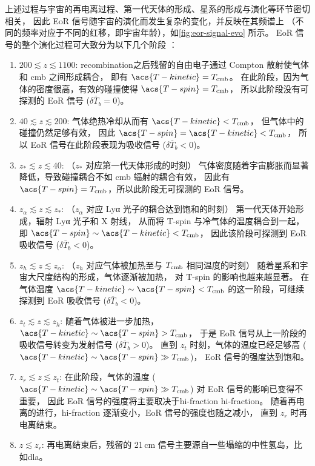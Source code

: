 上述过程与宇宙的再电离过程、第一代天体的形成、星系的形成与演化等环节密切相关，
因此 EoR 信号随宇宙的演化而发生复杂的变化，并反映在其频谱上
（不同的频率对应于不同的红移，即宇宙年龄），如\autoref{fig:eor-signal-evo} 所示。
EoR 信号的整个演化过程可大致分为以下几个阶段 \cite{pritchard2012}：
\begin{enumerate}
  \item $200 \lesssim z \lesssim 1100$:
    \ac{recombination}之后残留的自由电子通过 Compton 散射使气体
    和 \ac{cmb} 之间形成耦合，
    即有 $\acs{T-kinetic} = T_{\R{cmb}}$。
    在此阶段，因为气体的密度很高，有效的碰撞使得 $\acs{T-spin} = T_{\R{cmb}}$，
    所以此阶段没有可探测的 EoR 信号 ($\delta\overline{T}_b = 0$)。

  \item $40 \lesssim z \lesssim 200$:
    气体绝热冷却从而有 $\acs{T-kinetic} < T_{\R{cmb}}$，
    但气体中的碰撞仍然足够有效，
    因此 $\acs{T-spin} = \acs{T-kinetic} < T_{\R{cmb}}$，
    所以 EoR 信号在此阶段表现为吸收信号 ($\delta\overline{T}_b < 0$)。

  \item $z_* \lesssim z \lesssim 40$:
    （$z_*$ 对应第一代天体形成的时刻）
    气体密度随着宇宙膨胀而显著降低，导致碰撞耦合不如 \ac{cmb} 辐射的耦合有效，
    因此有 $\acs{T-spin} = T_{\R{cmb}}$，所以此阶段无可探测的 EoR 信号。

  \item $z_{\alpha} \lesssim z \lesssim z_*$:
    （$z_{\alpha}$ 对应 Lyα 光子的耦合达到饱和的时刻）
    第一代天体开始形成，辐射 Lyα 光子和 X 射线，
    从而将 \acs{T-spin} 与冷气体的温度耦合到一起，
    即 $\acs{T-spin} \sim \acs{T-kinetic} < T_{\R{cmb}}$，
    因此该阶段可探测到 EoR 吸收信号 ($\delta\overline{T}_b < 0$)。

  \item $z_h \lesssim z \lesssim z_{\alpha}$:
    （$z_h$ 对应气体被加热至与 $T_{\mathrm{cmb}}$ 相同温度的时刻）
    随着星系和宇宙大尺度结构的形成，气体逐渐被加热，
    对 \acs{T-spin} 的影响也越来越显著。
    在气体温度 $\acs{T-kinetic} \sim \acs{T-spin} < T_{\R{cmb}}$
    的这一阶段，可继续探测到 EoR 吸收信号 ($\delta\overline{T}_b < 0$)。

  \item $z_t \lesssim z \lesssim z_h$:
    随着气体被进一步加热，$\acs{T-kinetic} \sim \acs{T-spin} > T_{\R{cmb}}$，
    于是 EoR 信号从上一阶段的吸收信号转变为发射信号 ($\delta\overline{T}_b > 0$)。
    直到 $z_t$ 时刻，气体的温度已经足够高
    ($\acs{T-kinetic} \sim \acs{T-spin} \gg T_{\R{cmb}}$)，
    EoR 信号的强度达到饱和。

  \item $z_r \lesssim z \lesssim z_t$:
    在此阶段，气体的温度 ($\acs{T-kinetic} \sim \acs{T-spin} \gg T_{\R{cmb}}$)
    对 EoR 信号的影响已变得不重要，
    因此 EoR 信号的强度将主要取决于\acl{hi-fraction} \acs{hi-fraction}。
    随着再电离的进行，\acs{hi-fraction} 逐渐变小，EoR 信号的强度也随之减小，
    直到 $z_r$ 时再电离结束。

  \item $z \lesssim z_r$:
    再电离结束后，残留的 21\,cm 信号主要源自一些塌缩的中性氢岛，比如\ac{dla}。
\end{enumerate}

